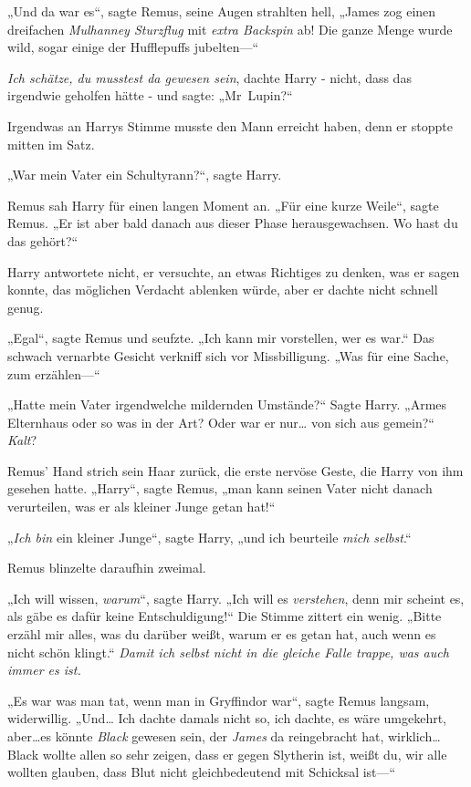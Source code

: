 {„Und da war es“, sagte Remus, seine Augen strahlten hell, „James zog einen dreifachen \emph{Mulhanney Sturzflug} mit \emph{extra Backspin} ab! Die ganze Menge wurde wild, sogar einige der Hufflepuffs jubelten—“

\emph{Ich schätze, du musstest da gewesen sein}, dachte Harry - nicht, dass das irgendwie geholfen hätte - und sagte: „Mr~Lupin?“

Irgendwas an Harrys Stimme musste den Mann erreicht haben, denn er stoppte mitten im Satz.

„War mein Vater ein Schultyrann?“, sagte Harry.

Remus sah Harry für einen langen Moment an. „Für eine kurze Weile“, sagte Remus. „Er ist aber bald danach aus dieser Phase herausgewachsen. Wo hast du das gehört?“

Harry antwortete nicht, er versuchte, an etwas Richtiges zu denken, was er sagen konnte, das möglichen Verdacht ablenken würde, aber er dachte nicht schnell genug.

„Egal“, sagte Remus und seufzte. „Ich kann mir vorstellen, wer es war.“ Das schwach vernarbte Gesicht verkniff sich vor Missbilligung. „Was für eine Sache, zum erzählen—“

„Hatte mein Vater irgendwelche mildernden Umstände?“ Sagte Harry. „Armes Elternhaus oder so was in der Art? Oder war er nur… von sich aus gemein?“ \emph{Kalt}?

Remus' Hand strich sein Haar zurück, die erste nervöse Geste, die Harry von ihm gesehen hatte. „Harry“, sagte Remus, „man kann seinen Vater nicht danach verurteilen, was er als kleiner Junge getan hat!“

„\emph{Ich bin} ein kleiner Junge“, sagte Harry, „und ich beurteile \emph{mich selbst}.“

Remus blinzelte daraufhin zweimal.

„Ich will wissen, \emph{warum}“, sagte Harry. „Ich will es \emph{verstehen}, denn mir scheint es, als gäbe es dafür keine Entschuldigung!“ Die Stimme zittert ein wenig. „Bitte erzähl mir alles, was du darüber weißt, warum er es getan hat, auch wenn es nicht schön klingt.“ \emph{Damit ich selbst nicht in die gleiche Falle trappe, was auch immer es ist.}

„Es war was man tat, wenn man in Gryffindor war“, sagte Remus langsam, widerwillig. „Und… Ich dachte damals nicht so, ich dachte, es wäre umgekehrt, aber…es könnte \emph{Black} gewesen sein, der \emph{James} da reingebracht hat, wirklich…Black wollte allen so sehr zeigen, dass er gegen Slytherin ist, weißt du, wir alle wollten glauben, dass Blut nicht gleichbedeutend mit Schicksal ist—“

}
